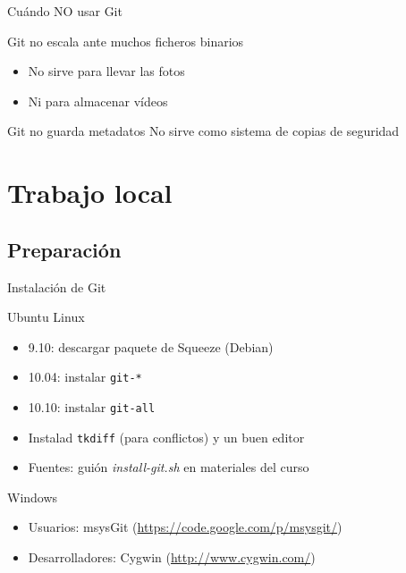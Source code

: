 \documentclass[xcolor=svgnames]{beamer}
\newcommand*{\paquete}[1]{\texttt{#1}}
\newcommand*{\fichero}[1]{\textit{#1}}
\begin{document}
\begin{frame}{Cuándo NO usar Git}

  \begin{block}{Git no escala ante muchos ficheros binarios}
    \begin{itemize}
    \item No sirve para llevar las fotos
    \item Ni para almacenar vídeos
    \end{itemize}
  \end{block}

  \begin{block}{Git no guarda metadatos}
    No sirve como sistema de copias de seguridad
  \end{block}

\end{frame}

\section[Local]{Trabajo local}

\subsection{Preparación}

\begin{frame}{Instalación de Git}
  \begin{block}{Ubuntu Linux}
    \begin{itemize}
    \item 9.10: descargar paquete de Squeeze (Debian)
    \item 10.04: instalar \paquete{git-*}
    \item 10.10: instalar \paquete{git-all}
    \item Instalad \paquete{tkdiff} (para conflictos) y un buen editor
    \item Fuentes: guión \fichero{install-git.sh} en materiales del curso
    \end{itemize}
  \end{block}

  \begin{block}{Windows}
    \begin{itemize}
    \item Usuarios: msysGit (\url{https://code.google.com/p/msysgit/})
    \item Desarrolladores: Cygwin (\url{http://www.cygwin.com/})
    \end{itemize}
  \end{block}
\end{frame}
\end{document}

